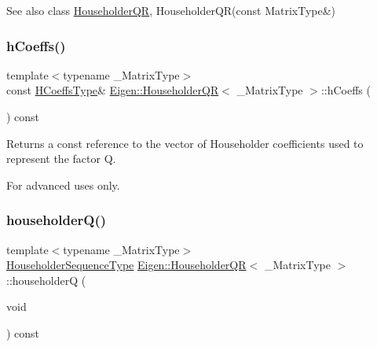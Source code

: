 \begin{DoxySeeAlso}{See also}
class \mbox{\hyperlink{class_eigen_1_1_householder_q_r}{Householder\+QR}}, Householder\+Q\+R(const Matrix\+Type\&) 
\end{DoxySeeAlso}
\mbox{\label{class_eigen_1_1_householder_q_r_ae931aa44cde62317b57a9ae661d184be}} 
\subsubsection{\texorpdfstring{hCoeffs()}{hCoeffs()}}
{\footnotesize\ttfamily template$<$typename \+\_\+\+Matrix\+Type$>$ \\
const \mbox{\hyperlink{struct_eigen_1_1internal_1_1true__type}{H\+Coeffs\+Type}}\& \mbox{\hyperlink{class_eigen_1_1_householder_q_r}{Eigen\+::\+Householder\+QR}}$<$ \+\_\+\+Matrix\+Type $>$\+::h\+Coeffs (\begin{DoxyParamCaption}{ }\end{DoxyParamCaption}) const\hspace{0.3cm}{\ttfamily [inline]}}

\begin{DoxyReturn}{Returns}
a const reference to the vector of Householder coefficients used to represent the factor {\ttfamily Q}.
\end{DoxyReturn}
For advanced uses only. \mbox{\label{class_eigen_1_1_householder_q_r_affd506c10ef2d25f56e7b1f9f25ff885}} 
\subsubsection{\texorpdfstring{householderQ()}{householderQ()}}
{\footnotesize\ttfamily template$<$typename \+\_\+\+Matrix\+Type$>$ \\
\mbox{\hyperlink{class_eigen_1_1_householder_sequence}{Householder\+Sequence\+Type}} \mbox{\hyperlink{class_eigen_1_1_householder_q_r}{Eigen\+::\+Householder\+QR}}$<$ \+\_\+\+Matrix\+Type $>$\+::householderQ (\begin{DoxyParamCaption}\item[{void}]{ }\end{DoxyParamCaption}) const\hspace{0.3cm}{\ttfamily [inline]}}

